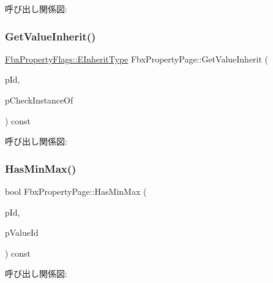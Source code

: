 呼び出し関係図\+:
\mbox{\label{class_fbx_property_page_a44e32a9788c02fdafcfdbf6e698fada2}} 
\subsubsection{\texorpdfstring{Get\+Value\+Inherit()}{GetValueInherit()}}
{\footnotesize\ttfamily \hyperlink{class_fbx_property_flags_ae3b667a4fcac4b827fa186a698fec2f8}{Fbx\+Property\+Flags\+::\+E\+Inherit\+Type} Fbx\+Property\+Page\+::\+Get\+Value\+Inherit (\begin{DoxyParamCaption}\item[{\hyperlink{fbxtypes_8h_a088fa96de3b0b3ea69f0f6afef525dfb}{Fbx\+Int}}]{p\+Id,  }\item[{bool}]{p\+Check\+Instance\+Of }\end{DoxyParamCaption}) const}

呼び出し関係図\+:
\mbox{\label{class_fbx_property_page_a3d7bbffaca7c15324947766e62f6f6ba}} 
\subsubsection{\texorpdfstring{Has\+Min\+Max()}{HasMinMax()}}
{\footnotesize\ttfamily bool Fbx\+Property\+Page\+::\+Has\+Min\+Max (\begin{DoxyParamCaption}\item[{\hyperlink{fbxtypes_8h_a088fa96de3b0b3ea69f0f6afef525dfb}{Fbx\+Int}}]{p\+Id,  }\item[{\hyperlink{class_fbx_property_info_a83069f079a29bde133f2e9324de5af43}{Fbx\+Property\+Info\+::\+E\+Value\+Index}}]{p\+Value\+Id }\end{DoxyParamCaption}) const}

呼び出し関係図\+:
\mbox{\label{class_fbx_property_page_abe87c30c0b9c9eefdf4cb51a4479cb04}} 

